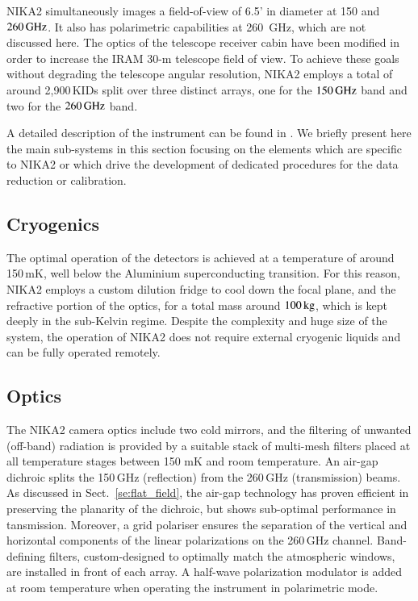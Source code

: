
NIKA2 simultaneously images a field-of-view of
6.5' in diameter at 150 and $260\,\rm{GHz}$. It also has polarimetric
capabilities at 260~GHz, which are not discussed here. The optics of
the telescope receiver cabin have been modified in order
to increase the IRAM 30-m telescope field of view. To achieve these
goals without degrading the
telescope angular resolution, NIKA2 employs a total of around
2,900\,KIDs split over three distinct arrays, one for the $150\,\rm{GHz}$
band and two for the $260\,\rm{GHz}$ band.

A detailed description of the instrument can be found in
\citet{Adam2018}. We briefly present here the main sub-systems in this
section focusing on the elements which are specific to NIKA2 or
which drive the development of dedicated procedures for the data reduction or
calibration.


\subsection{Cryogenics}

The optimal operation of the detectors is achieved at a temperature of around
150\,mK, well below the Aluminium superconducting transition. For this reason,
NIKA2 employs a custom dilution fridge to cool down the focal plane, and the
refractive portion of the optics, for a total mass around $100\, \rm{kg}$,
which is kept deeply in the
sub-Kelvin regime. Despite the complexity and huge size of the system, the operation
of NIKA2 does not require external cryogenic liquids and can be fully operated remotely.


\subsection{Optics}

The NIKA2 camera optics include two cold mirrors, and the filtering of
unwanted (off-band) radiation is provided by a suitable stack of
multi-mesh filters placed at all temperature stages between 150 mK and
room temperature. An air-gap dichroic splits the 150\,GHz (reflection)
from the 260\,GHz (transmission) beams. As discussed in
Sect.~\ref{se:flat_field}, the air-gap technology has proven efficient
in preserving the planarity of the dichroic, but shows sub-optimal
performance in tansmission. Moreover, a grid polariser ensures the separation of
the vertical and horizontal components of the linear polarizations
on the 260\,GHz channel. Band-defining filters, custom-designed to
optimally match the atmospheric windows, are installed in
front of each array. A half-wave polarization modulator is added at room
temperature when operating the instrument in polarimetric mode.

